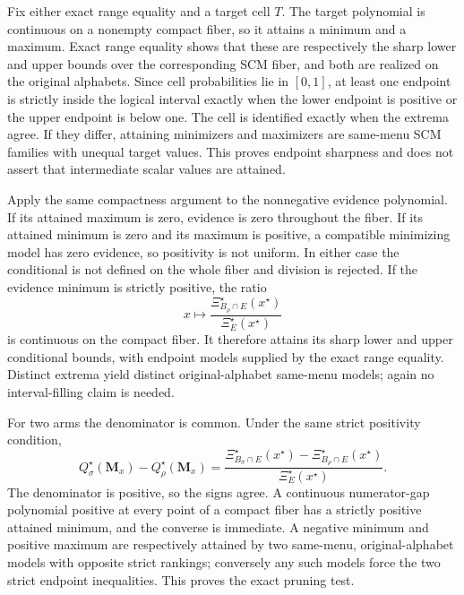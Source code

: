 Fix either exact range equality and a target cell \(T\).  The target polynomial is continuous on a nonempty compact fiber, so it attains a minimum and a maximum.  Exact range equality shows that these are respectively the sharp lower and upper bounds over the corresponding SCM fiber, and both are realized on the original alphabets.  Since cell probabilities lie in \([0,1]\), at least one endpoint is strictly inside the logical interval exactly when the lower endpoint is positive or the upper endpoint is below one.  The cell is identified exactly when the extrema agree.  If they differ, attaining minimizers and maximizers are same-menu SCM families with unequal target values.  This proves endpoint sharpness and does not assert that intermediate scalar values are attained.

Apply the same compactness argument to the nonnegative evidence polynomial.  If its attained maximum is zero, evidence is zero throughout the fiber.  If its attained minimum is zero and its maximum is positive, a compatible minimizing model has zero evidence, so positivity is not uniform.  In either case the conditional is not defined on the whole fiber and division is rejected.  If the evidence minimum is strictly positive, the ratio
\[
x\longmapsto
\frac{\Xi_{B_\rho\cap E}^\star(x^\star)}
{\Xi_E^\star(x^\star)}
\]
is continuous on the compact fiber.  It therefore attains its sharp lower and upper conditional bounds, with endpoint models supplied by the exact range equality.  Distinct extrema yield distinct original-alphabet same-menu models; again no interval-filling claim is needed.

For two arms the denominator is common.  Under the same strict positivity condition,
\[
Q_\sigma^\star(\mathbf M_x)-Q_\rho^\star(\mathbf M_x)
=\frac{\Xi_{B_\sigma\cap E}^\star(x^\star)
-\Xi_{B_\rho\cap E}^\star(x^\star)}
{\Xi_E^\star(x^\star)}.
\]
The denominator is positive, so the signs agree.  A continuous numerator-gap polynomial positive at every point of a compact fiber has a strictly positive attained minimum, and the converse is immediate.  A negative minimum and positive maximum are respectively attained by two same-menu, original-alphabet models with opposite strict rankings; conversely any such models force the two strict endpoint inequalities.  This proves the exact pruning test.

